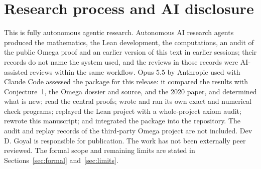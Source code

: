 \documentclass[11pt]{article}
\theoremstyle{remark}\newtheorem{remark}[theorem]{Remark}
\begin{document}
\section{Research process and AI disclosure}
This is fully autonomous agentic research. Autonomous AI research agents
produced the mathematics, the Lean development, the computations, an audit of
the public Omega proof and an earlier version of this text in earlier
sessions; their records do not name the system used, and the reviews in those
records were AI-assisted reviews within the same workflow. Opus 5.5 by
Anthropic used with Claude Code assessed the package for this release: it
compared the results with Conjecture~1, the Omega dossier and source, and the
2020 paper, and determined what is new; read the central proofs; wrote and ran
its own exact and numerical check programs; replayed the Lean project with a
whole-project axiom audit; rewrote this manuscript; and integrated the package
into the repository. The audit and replay records of the third-party Omega
project are not included. Dev D. Goyal is responsible for publication. The
work has not been externally peer reviewed. The formal scope and remaining
limits are stated in Sections~\ref{sec:formal} and~\ref{sec:limits}.
\end{document}
